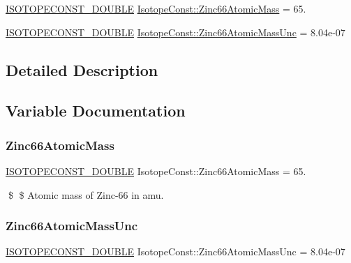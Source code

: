 \begin{DoxyCompactItemize}
\item 
\mbox{\hyperlink{group___isotope_const-_macros_ga8f45a7272ce02c0b4c65c44636ed719a}{I\+S\+O\+T\+O\+P\+E\+C\+O\+N\+S\+T\+\_\+\+D\+O\+U\+B\+LE}} \mbox{\hyperlink{group___isotope_const-_zinc-_zn66_ga15e37d9973a27d517b6682d5e0c8e5a4}{Isotope\+Const\+::\+Zinc66\+Atomic\+Mass}} = 65.
\item 
\mbox{\hyperlink{group___isotope_const-_macros_ga8f45a7272ce02c0b4c65c44636ed719a}{I\+S\+O\+T\+O\+P\+E\+C\+O\+N\+S\+T\+\_\+\+D\+O\+U\+B\+LE}} \mbox{\hyperlink{group___isotope_const-_zinc-_zn66_ga97a240ac76820ac2c3192496897a6732}{Isotope\+Const\+::\+Zinc66\+Atomic\+Mass\+Unc}} = 8.\+04e-\/07
\end{DoxyCompactItemize}


\subsection{Detailed Description}


\subsection{Variable Documentation}
\mbox{\label{group___isotope_const-_zinc-_zn66_ga15e37d9973a27d517b6682d5e0c8e5a4}} 
\subsubsection{\texorpdfstring{Zinc66\+Atomic\+Mass}{Zinc66AtomicMass}}
{\footnotesize\ttfamily \mbox{\hyperlink{group___isotope_const-_macros_ga8f45a7272ce02c0b4c65c44636ed719a}{I\+S\+O\+T\+O\+P\+E\+C\+O\+N\+S\+T\+\_\+\+D\+O\+U\+B\+LE}} Isotope\+Const\+::\+Zinc66\+Atomic\+Mass = 65.}

\$ \$ Atomic mass of Zinc-\/66 in amu. \mbox{\label{group___isotope_const-_zinc-_zn66_ga97a240ac76820ac2c3192496897a6732}} 
\subsubsection{\texorpdfstring{Zinc66\+Atomic\+Mass\+Unc}{Zinc66AtomicMassUnc}}
{\footnotesize\ttfamily \mbox{\hyperlink{group___isotope_const-_macros_ga8f45a7272ce02c0b4c65c44636ed719a}{I\+S\+O\+T\+O\+P\+E\+C\+O\+N\+S\+T\+\_\+\+D\+O\+U\+B\+LE}} Isotope\+Const\+::\+Zinc66\+Atomic\+Mass\+Unc = 8.\+04e-\/07}

